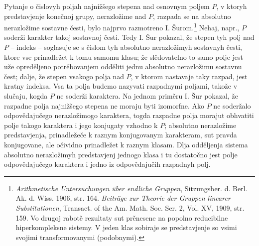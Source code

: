 \documentclass[11pt]{article}
\begin{document}
\setcounter{footnote}{0}

\noindent Pytanje o čislovyh poljah najnižšego stepena nad osnovnym poljem $P$, v ktoryh predstavjenje konečnoj grupy, nerazložime nad $P$, razpada se na absolutno nerazložime sostavne česti, bylo najprvo razmotreno I. Šurom.\footnote{\emph{Arithmetische Untersuchungen über endliche Gruppen}, Sitzungsber. d. Berl. Ak. d. Wiss. 1906, str. 164. \emph{Beiträge zur Theorie der Gruppen linearer Substitutionen}, Transact. of the Am. Math. Soc. Ser. 2, Vol. XV, 1909, str. 159. Vo drugoj rabotě rezultaty sut prěnesene na popolno reducibilne hiperkompleksne sistemy. V jeden klas sobiraje se predstavjenje so vsimi svojimi transformovanymi (podobnymi).} Nehaj, napr., $P$ soderži karakter takoj sostavnoj česti. Tedy I. Šur pokazal, že stepen tyh polj nad $P$ -- indeks -- soglasuje se s čislom tyh absolutno nerazložimyh sostavnyh česti, ktore vse prinadležet k tomu samomu klasu; že slědovatelno to samo polje jest uže opreděljeno potrěbovanjem odděliti jednu absolutno nerazložimu sostavnu čest; dalje, že stepen vsakogo polja nad $P$, v ktorom nastavaje taky razpad, jest kratny indeksa. Vsa ta polja budemo nazyvati razpadnymi poljami, takože v slučaju, kogda $P$ ne soderži karaktera. Na jednom priměru I. Šur pokazal, že razpadne polja najnižšego stepena ne moraju byti izomorfne. Ako $P$ ne soderžalo odpovědajučego nerazložimogo karaktera, togda razpadne polja morajut obhvatiti polje takogo karaktera i jego konjugaty vzhodno k $P$; absolutno nerazložime predstavjenja, prinadležeče k raznym konjugovanym karakteram, sut pravda konjugovane, ale očividno prinadležet k raznym klasam. Dlja odděljenja sistema absolutno nerazložimyh predstavjenj jednogo klasa i tu dostatočno jest polje odpovědajučego karaktera i jedno iz odpovědajučih razpadnyh polj.
\end{document}
